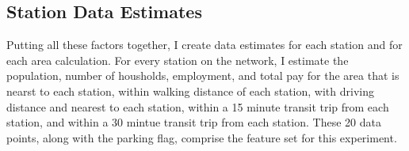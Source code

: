 \documentclass{article}
\begin{document}
\subsection{Station Data Estimates}

Putting all these factors together, I create data estimates for each station and for each area calculation. For every station on the network, I estimate the population, number of housholds, employment, and total pay for the area that is nearst to each station, within walking distance of each station, with driving distance and nearest to each station, within a 15 minute transit trip from each station, and within a 30 mintue transit trip from each station. These 20 data points, along with the parking flag, comprise the feature set for this experiment. 
\end{document}
